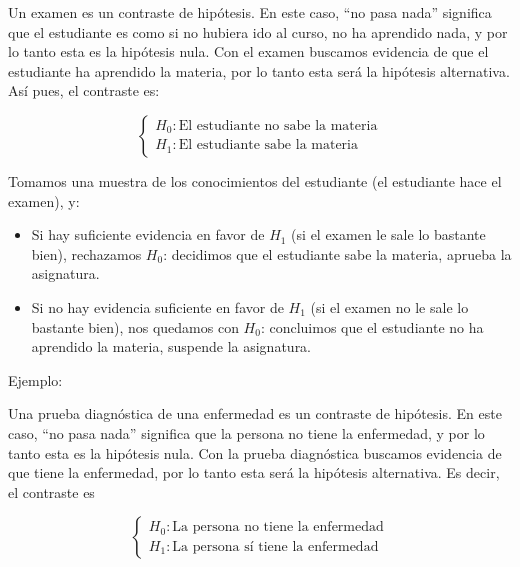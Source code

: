 \documentclass[
  spanish,
  letterpaper,
  DIV=11,
  numbers=noendperiod]{scrreprt}
\begin{document}
Un examen es un contraste de hipótesis. En este caso, ``no pasa nada''
significa que el estudiante es como si no hubiera ido al curso, no ha
aprendido nada, y por lo tanto esta es la hipótesis nula. Con el examen
buscamos evidencia de que el estudiante ha aprendido la materia, por lo
tanto esta será la hipótesis alternativa. Así pues, el contraste es:

\[
\left\{\begin{array}{ll} 
H_{0}:\text{El estudiante no sabe la materia}\\ 
H_{1}:\text{El estudiante sabe la materia}
\end{array}
\right.
\]

Tomamos una muestra de los conocimientos del estudiante (el estudiante
hace el examen), y:

\begin{itemize}
\item
  Si hay suficiente evidencia en favor de \(H_1\) (si el examen le sale
  lo bastante bien), rechazamos \(H_0\): decidimos que el estudiante
  sabe la materia, aprueba la asignatura.
\item
  Si no hay evidencia suficiente en favor de \(H_1\) (si el examen no le
  sale lo bastante bien), nos quedamos con \(H_0\): concluimos que el
  estudiante no ha aprendido la materia, suspende la asignatura.
\end{itemize}

Ejemplo:

Una prueba diagnóstica de una enfermedad es un contraste de hipótesis.
En este caso, ``no pasa nada'' significa que la persona no tiene la
enfermedad, y por lo tanto esta es la hipótesis nula. Con la prueba
diagnóstica buscamos evidencia de que tiene la enfermedad, por lo tanto
esta será la hipótesis alternativa. Es decir, el contraste es

\[
\left\{\begin{array}{ll} 
H_{0}:\text{La persona no tiene la enfermedad}\\ 
H_{1}:\text{La persona sí tiene la enfermedad}
\end{array}
\right.
\]
\end{document}

